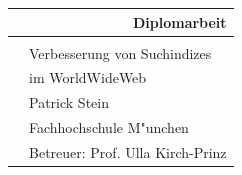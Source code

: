 \begin{titlepage}

\Huge
\begin{tabular}{p{20mm}l}
\multicolumn{2}{r}{\bf Diplomarbeit}\\
\hline \\[30mm]
&Verbesserung von Suchindizes\\
&im World\/Wide\/Web\\[100mm]
&{\huge Patrick Stein}\\
&{\huge Fachhochschule M"unchen}\\
&{\huge Betreuer: Prof. Ulla Kirch-Prinz}\\
\hline
\end{tabular}
\normalsize

\end{titlepage}
